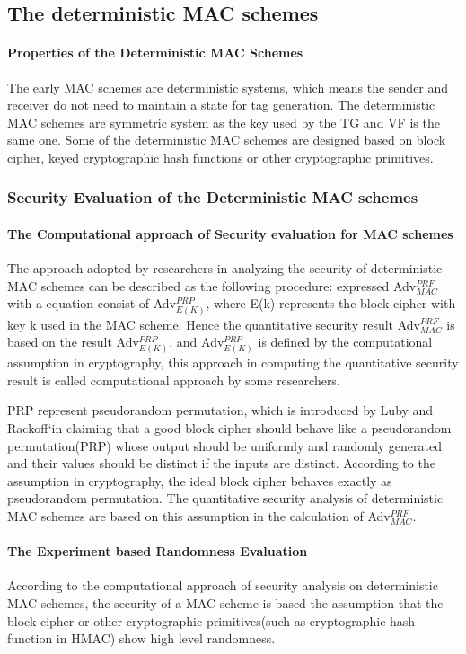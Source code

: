 \documentclass{article}
\begin{document}
\subsection{The deterministic MAC schemes}
\paragraph{Properties of the Deterministic MAC Schemes}
The early MAC schemes are deterministic systems, which means the sender and receiver do not need to maintain a state for tag generation. The deterministic MAC schemes are symmetric system as the key used by the TG and VF is the same one. Some of the deterministic MAC schemes are designed based on block cipher, keyed cryptographic hash functions or other cryptographic primitives.
\subsubsection{Security Evaluation of the Deterministic MAC schemes}
\paragraph{The Computational approach of Security evaluation for MAC schemes}
The approach adopted by researchers in analyzing the security of deterministic MAC schemes can be described as the following procedure: expressed Adv$^{PRF}_{MAC}$ with a equation consist of Adv$^{PRP}_{E(K)}$, where E(k) represents the block cipher with key k used in the MAC scheme. Hence the quantitative security result Adv$^{PRF}_{MAC}$ is based on the result Adv$^{PRP}_{E(K)}$, and Adv$^{PRP}_{E(K)}$ is defined by the computational assumption in cryptography, this approach in computing the quantitative security result is called computational approach by some researchers.

PRP represent pseudorandom permutation, which is introduced by Luby and Rackoff`in \cite{PRP} claiming that a good block cipher should
behave like a pseudorandom permutation(PRP) whose output should be uniformly and randomly generated and their values
should be distinct if the inputs are distinct.
According to the assumption in cryptography, the ideal block cipher behaves exactly as pseudorandom permutation. The quantitative security analysis of deterministic MAC schemes are based on this assumption in the calculation of Adv$^{PRF}_{MAC}$.
\paragraph{The Experiment based Randomness Evaluation}
According to the computational approach of security analysis on deterministic MAC schemes, the security of a MAC scheme is based the assumption that the block cipher or other cryptographic primitives(such as cryptographic hash function in HMAC) show high level randomness. 
\end{document}
